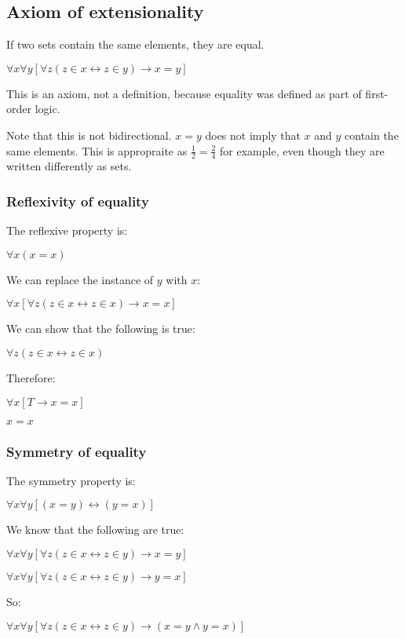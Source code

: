 
\subsection{Axiom of extensionality}

If two sets contain the same elements, they are equal.

\(\forall x \forall y[\forall z(z\in x \leftrightarrow z\in y)\rightarrow x=y]\)

This is an axiom, not a definition, because equality was defined as part of first-order logic.

Note that this is not bidirectional. \(x=y\) does not imply that \(x\) and \(y\) contain the same elements. This is appropraite as \(\frac{1}{2}= \frac{2}{4}\) for example, even though they are written differently as sets.

\subsubsection{Reflexivity of equality}

The reflexive property is:

\(\forall x(x=x)\)

We can replace the instance of \(y\)  with \(x\):

\(\forall x [\forall z(z\in x \leftrightarrow z\in x)\rightarrow x=x]\)

We can show that the following is true:

\(\forall z(z\in x \leftrightarrow z\in x)\)

Therefore:

\(\forall x [T \rightarrow x=x]\)

\(x=x\)

\subsubsection{Symmetry of equality}

The symmetry property is:

\(\forall x \forall y[(x=y)\leftrightarrow (y=x)]\)

We know that the following are true:

\(\forall x \forall y[\forall z(z\in x \leftrightarrow z\in y)\rightarrow x=y]\)

\(\forall x \forall y[\forall z(z\in x \leftrightarrow z\in y)\rightarrow y=x]\)

So:

\(\forall x \forall y[\forall z(z\in x \leftrightarrow z\in y)\rightarrow (x=y\land y=x)]\)

